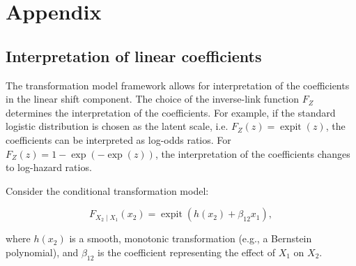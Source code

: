 



\chapter{Appendix}



% 






\section{Interpretation of linear coefficients} \label{sec:interpretation_linear_coefficients}

The transformation model framework allows for interpretation of the coefficients in the linear shift component. The choice of the inverse-link function $F_Z$ determines the interpretation of the coefficients. For example, if the standard logistic distribution is chosen as the latent scale, i.e. $F_Z(z) = \operatorname{expit}(z)$, the coefficients can be interpreted as log-odds ratios. For $F_Z(z) = 1-\exp(-\exp(z))$, the interpretation of the coefficients changes to log-hazard ratios.

Consider the conditional transformation model:

\begin{equation}
F_{X_2 \mid X_1}(x_2) = \operatorname{expit}( h(x_2) + \beta_{12} x_1 ),
\end{equation}


where $h(x_2)$ is a smooth, monotonic transformation (e.g., a Bernstein polynomial), and $\beta_{12}$ is the coefficient representing the effect of $X_1$ on $X_2$.

